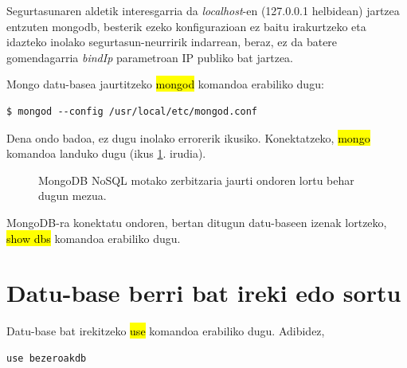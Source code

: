 Segurtasunaren aldetik interesgarria da \textit{localhost}-en (127.0.0.1 helbidean) jartzea entzuten mongodb, besterik ezeko konfigurazioan ez baitu irakurtzeko eta idazteko inolako segurtasun-neurririk indarrean, beraz, ez da batere gomendagarria \textit{bindIp} parametroan IP publiko bat jartzea.

Mongo datu-basea jaurtitzeko \hl{mongod} komandoa erabiliko dugu:

\begin{lstlisting}[numbers=none]
$ mongod --config /usr/local/etc/mongod.conf
\end{lstlisting}
 Dena ondo badoa, ez dugu inolako errorerik ikusiko. Konektatzeko, \hl{mongo} komandoa landuko dugu (ikus \ref{fig:mongodb}. irudia).
 
 \begin{figure}[ht]
	\centering
{}
\caption{MongoDB NoSQL motako zerbitzaria jaurti ondoren lortu behar dugun mezua.}
\label{fig:mongodb}
\end{figure}

MongoDB-ra konektatu ondoren, bertan ditugun datu-baseen izenak lortzeko, \hl{show dbs} komandoa erabiliko dugu. 

\section{Datu-base berri bat ireki edo sortu}

Datu-base bat irekitzeko \hl{use} komandoa erabiliko dugu. Adibidez, 

\begin{lstlisting}[numbers=none]
use bezeroakdb
\end{lstlisting}

